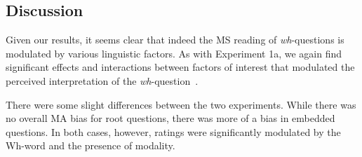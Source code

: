 \documentclass[12pt,letterpaper,table,svgnames,dvipsnames]{article}
\newcommand{\figref}[1]{Fig.~\ref{#1}}
\newcommand{\whq}{\emph{wh}-question~}
\begin{document}
\begin{table}[p!]
\begin{center}
\begin{tabular}{llllll}


\bottomrule
\end{tabular} 
\end{center} 
\end{table}

\subsection{Discussion}

Given our results, it seems clear that indeed the MS reading of \emph{wh}-questions is modulated by various linguistic factors. As with Experiment 1a, we again find significant effects and interactions between factors of interest that modulated the perceived interpretation of the \whq. 


There were some slight differences between the two experiments. While there was no overall MA bias for root questions, there was more of a bias in embedded questions. In both cases, however, ratings were significantly modulated by the Wh-word and the presence of modality. 







\end{document}
